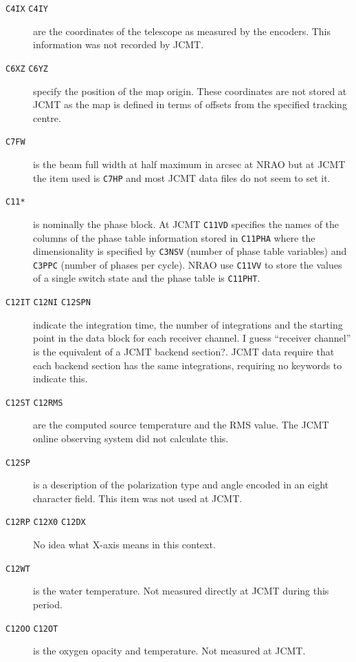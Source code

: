 \documentclass[final,authoryear,5p,times,twocolumn]{elsarticle}
\begin{document}
\begin{description}
\item[\texttt{C4IX} \texttt{C4IY}] are the coordinates of the
  telescope as measured by the encoders. This information was not
  recorded by JCMT.

\item[\texttt{C6XZ} \texttt{C6YZ}] specify the position of the map
  origin. These coordinates are not stored at JCMT as the map is
  defined in terms of offsets from the specified tracking centre.

\item[\texttt{C7FW}] is the beam full width at half maximum in arcsec
  at NRAO but at JCMT the item used is \texttt{C7HP} and most JCMT data
  files do not seem to set it.

\item[\texttt{C11*}] is nominally the phase block. At JCMT
  \texttt{C11VD} specifies the names of the columns of the phase table
  information stored in \texttt{C11PHA} where the dimensionality is
  specified by \texttt{C3NSV} (number of phase table variables) and
  \texttt{C3PPC} (number of phases per cycle). NRAO use \texttt{C11VV}
  to store the values of a single switch state and the phase table is
  \texttt{C11PHT}.

\item[\texttt{C12IT} \texttt{C12NI} \texttt{C12SPN}] indicate the integration time,
  the number of integrations and the starting point in the data block
  for each receiver channel. {\color{red} I guess ``receiver channel''
    is the equivalent of a JCMT backend section?}. JCMT data require
  that each backend section has the same integrations, requiring no
  keywords to indicate this.

\item[\texttt{C12ST} \texttt{C12RMS}] are the computed source
  temperature and the RMS value. The JCMT online observing system did
  not calculate this.

\item[\texttt{C12SP}] is a description of the polarization type and
  angle encoded in an eight character field. This item was not used at
  JCMT.

\item[\texttt{C12RP} \texttt{C12X0} \texttt{C12DX}] {\color{red} No
    idea what X-axis means in this context.}

\item[\texttt{C12WT}] is the water temperature. Not measured directly
  at JCMT during this period.

\item[\texttt{C12OO} \texttt{C12OT}] is the oxygen opacity and
  temperature. Not measured at JCMT.

\end{description}
\end{document}
